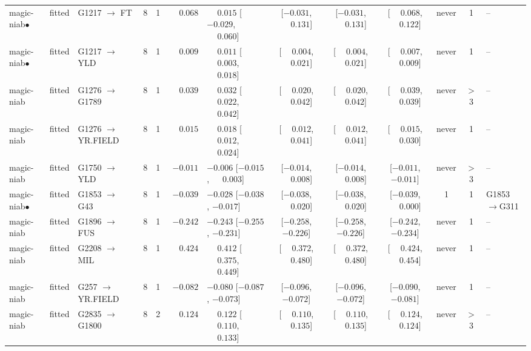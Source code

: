 \begin{landscape}
\begin{longtable}{@{}llp{2.15cm}ccrl cccc c l@{}}
magic-niab$\bullet$ & fitted & G1217 $\to$ FT & 8 & 1 & $\phantom{-}0.068$ & $\phantom{-}0.015$ [$-0.029$, $\phantom{-}0.060$] & [$-0.031$, $\phantom{-}0.131$] & [$-0.031$, $\phantom{-}0.131$] & [$\phantom{-}0.068$, $\phantom{-}0.122$] & never & 1 & -- \\
magic-niab$\bullet$ & fitted & G1217 $\to$ YLD & 8 & 1 & $\phantom{-}0.009$ & $\phantom{-}0.011$ [$\phantom{-}0.003$, $\phantom{-}0.018$] & [$\phantom{-}0.004$, $\phantom{-}0.021$] & [$\phantom{-}0.004$, $\phantom{-}0.021$] & [$\phantom{-}0.007$, $\phantom{-}0.009$] & never & 1 & -- \\
magic-niab & fitted & G1276 $\to$ G1789 & 8 & 1 & $\phantom{-}0.039$ & $\phantom{-}0.032$ [$\phantom{-}0.022$, $\phantom{-}0.042$] & [$\phantom{-}0.020$, $\phantom{-}0.042$] & [$\phantom{-}0.020$, $\phantom{-}0.042$] & [$\phantom{-}0.039$, $\phantom{-}0.039$] & never & $>$3 & -- \\
magic-niab & fitted & G1276 $\to$ YR.FIELD & 8 & 1 & $\phantom{-}0.015$ & $\phantom{-}0.018$ [$\phantom{-}0.012$, $\phantom{-}0.024$] & [$\phantom{-}0.012$, $\phantom{-}0.041$] & [$\phantom{-}0.012$, $\phantom{-}0.041$] & [$\phantom{-}0.015$, $\phantom{-}0.030$] & never & 1 & -- \\
magic-niab & fitted & G1750 $\to$ YLD & 8 & 1 & $-0.011$ & $-0.006$ [$-0.015$, $\phantom{-}0.003$] & [$-0.014$, $\phantom{-}0.008$] & [$-0.014$, $\phantom{-}0.008$] & [$-0.011$, $-0.011$] & never & $>$3 & -- \\
magic-niab$\bullet$ & fitted & G1853 $\to$ G43 & 8 & 1 & $-0.039$ & $-0.028$ [$-0.038$, $-0.017$] & [$-0.038$, $\phantom{-}0.020$] & [$-0.038$, $\phantom{-}0.020$] & [$-0.039$, $\phantom{-}0.000$] & 1 & 1 & G1853$\to$G311 \\
magic-niab & fitted & G1896 $\to$ FUS & 8 & 1 & $-0.242$ & $-0.243$ [$-0.255$, $-0.231$] & [$-0.258$, $-0.226$] & [$-0.258$, $-0.226$] & [$-0.242$, $-0.234$] & never & 1 & -- \\
magic-niab & fitted & G2208 $\to$ MIL & 8 & 1 & $\phantom{-}0.424$ & $\phantom{-}0.412$ [$\phantom{-}0.375$, $\phantom{-}0.449$] & [$\phantom{-}0.372$, $\phantom{-}0.480$] & [$\phantom{-}0.372$, $\phantom{-}0.480$] & [$\phantom{-}0.424$, $\phantom{-}0.454$] & never & 1 & -- \\
magic-niab & fitted & G257 $\to$ YR.FIELD & 8 & 1 & $-0.082$ & $-0.080$ [$-0.087$, $-0.073$] & [$-0.096$, $-0.072$] & [$-0.096$, $-0.072$] & [$-0.090$, $-0.081$] & never & 1 & -- \\
magic-niab & fitted & G2835 $\to$ G1800 & 8 & 2 & $\phantom{-}0.124$ & $\phantom{-}0.122$ [$\phantom{-}0.110$, $\phantom{-}0.133$] & [$\phantom{-}0.110$, $\phantom{-}0.135$] & [$\phantom{-}0.110$, $\phantom{-}0.135$] & [$\phantom{-}0.124$, $\phantom{-}0.124$] & never & $>$3 & -- \\

\end{longtable}
\end{landscape}
